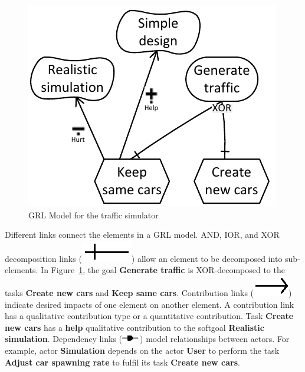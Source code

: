 \begin{figure}[ht]
\centering
\includegraphics[scale=0.35]{img/Example}
\caption{GRL Model for the traffic simulator}
\label{fig:trafficsim}
\end{figure}

Different links connect the elements in a GRL model. AND, IOR, and XOR decomposition links (\includegraphics[scale=1]{img/decomposition}) allow an element to be decomposed into sub-elements. In Figure~\ref{fig:trafficsim}, the goal \textbf{Generate traffic} is XOR-decomposed to the tasks \textbf{Create new cars} and \textbf{Keep same cars}. Contribution links (\includegraphics[scale=1]{img/contribution}) indicate desired impacts of one element on another element. A contribution link has a qualitative contribution type or a quantitative contribution. Task \textbf{Create new cars} has a \textbf{help} qualitative contribution to the softgoal \textbf{Realistic simulation}. Dependency links (\includegraphics[scale=1]{img/dependency}) model relationships between actors. For example, actor \textbf{Simulation} depends on the actor \textbf{User} to perform the task \textbf{Adjust car spawning rate} to fulfil its task \textbf{Create new cars}.

